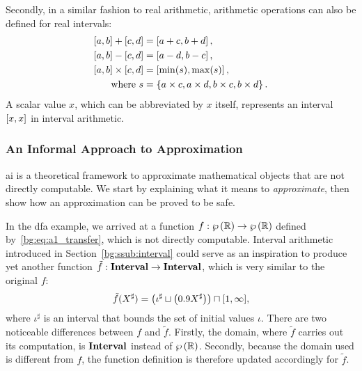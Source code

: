 Secondly, in a similar fashion to real arithmetic, arithmetic operations can
also be defined for real intervals:
\begin{equation}
    \begin{aligned}
        \left[{a}, {b}\right] + \left[{c}, {d}\right] &= \left[{a + c}, {b + d}\right], \\
        \left[{a}, {b}\right] - \left[{c}, {d}\right] &= \left[{a - d}, {b - c}\right], \\
        \left[{a}, {b}\right] \times \left[{c}, {d}\right]
            &= \left[{\min(s)}, {\max(s)}\right], \\
        \text{where~} s &= \left\{
            a \times c, a \times d, b \times c, b \times d
        \right\}.
    \end{aligned}
    \label{bg:eq:interval_operations}
\end{equation}
A scalar value $x$, which can be abbreviated by $x$ itself, represents an
interval $\left[{x}, {x}\right]$ in interval arithmetic.

\subsubsection{An Informal Approach to Approximation}
\label{bg:ssub:informal}

\Gls{ai} is a theoretical framework to approximate mathematical objects
that are not directly computable.  We start by explaining what it means to
\emph{approximate}, then show how an approximation can be proved to be safe.

In the \gls{dfa} example, we arrived at a function $f: \wp\left({\mathbb{R}}\right)
\to \wp\left({\mathbb{R}}\right)$ defined by~\eqref{bg:eq:a1_transfer}, which
is not directly computable.  Interval arithmetic introduced in
Section~\ref{bg:ssub:interval} could serve as an inspiration to produce yet
another function $\tilde{f}: \mathbf{Interval} \to \mathbf{Interval}$, which is very
similar to the original $f$:
\begin{equation}
    \tilde{f}(X^\sharp) = \left(
        \iota^\sharp \sqcup \left( 0.9 X^\sharp \right)
    \right) \sqcap [1, \infty],
    \label{bg:eq:a1_transfer_interval}
\end{equation}
where $\iota^\sharp$ is an interval that bounds the set of initial values
$\iota$.  There are two noticeable differences between $f$ and $\tilde{f}$.
Firstly, the domain, where $\tilde{f}$ carries out its computation, is
$\mathbf{Interval}$ instead of $\wp\left({\mathbb{R}}\right)$.  Secondly, because the domain
used is different from $f$, the function definition is therefore updated
accordingly for $\tilde{f}$.

